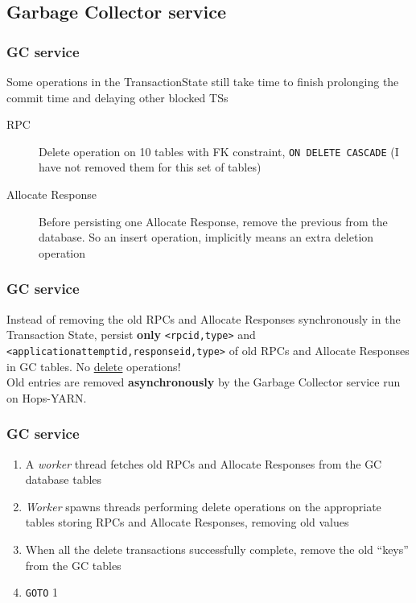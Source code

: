 \documentclass{beamer}
\begin{document}
\subsection{Garbage Collector service}
\begin{frame}
\frametitle{GC service}

Some operations in the TransactionState still take time to finish
prolonging the commit time and delaying other blocked TSs

\begin{description}
\item[RPC] Delete operation on 10 tables with FK constraint,
  \texttt{ON DELETE CASCADE} (I have not removed them for this set of tables)
\item[Allocate Response] Before persisting one Allocate Response,
  remove the previous from the database. So an insert operation,
  implicitly means an extra deletion operation
\end{description}
\end{frame}

\begin{frame}
\frametitle{GC service}

Instead of removing the old RPCs and Allocate Responses synchronously
in the Transaction State, persist \textbf{only} \texttt{<rpcid,type>}
and \texttt{<applicationattemptid,responseid,type>} of old RPCs and
Allocate Responses in GC tables. No \underline{delete} operations!\\[2em]

Old entries are removed \textbf{asynchronously} by the Garbage Collector
service run on Hops-YARN.
\end{frame}

\begin{frame}
\frametitle{GC service}

\begin{enumerate}
\item A \emph{worker} thread fetches old RPCs and Allocate Responses from the
  GC database tables

\item \emph{Worker} spawns threads performing delete operations on the
  appropriate tables storing RPCs and Allocate Responses, removing old
  values

\item When all the delete transactions successfully complete, remove
  the old ``keys'' from the GC tables

\item \texttt{GOTO} 1
\end{enumerate}
\end{frame}
\end{document}
